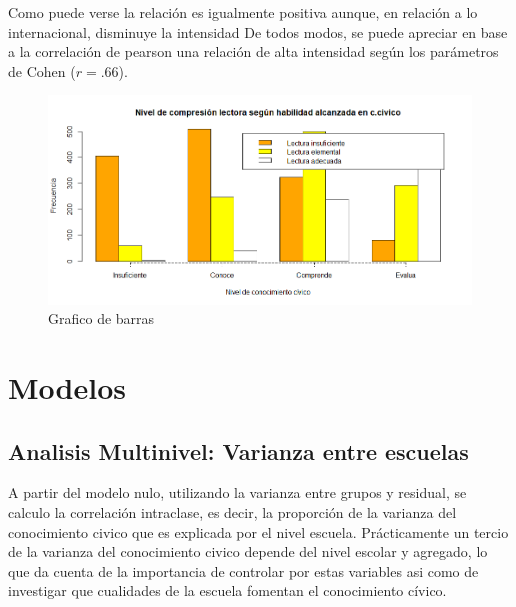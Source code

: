 \documentclass[12pt,twoside]{templates/facsothesis}
\begin{document}
Como puede verse la relación es igualmente positiva aunque, en relación a lo internacional, disminuye la intensidad De todos modos, se puede apreciar en base a la correlación de pearson una relación de alta intensidad según los parámetros de Cohen (\(r= .66\)).

\begin{figure}

{\centering \includegraphics[width=0.8\linewidth]{images/barpot} 

}

\caption{Grafico de barras}\label{fig:unnamed-chunk-10}
\end{figure}

\hypertarget{modelos}{%
\section{Modelos}\label{modelos}}

\hypertarget{analisis-multinivel-varianza-entre-escuelas}{%
\subsection{Analisis Multinivel: Varianza entre escuelas}\label{analisis-multinivel-varianza-entre-escuelas}}

A partir del modelo nulo, utilizando la varianza entre grupos y residual, se calculo la correlación intraclase, es decir, la proporción de la varianza del conocimiento civico que es explicada por el nivel escuela. Prácticamente un tercio de la varianza del conocimiento civico depende del nivel escolar y agregado, lo que da cuenta de la importancia de controlar por estas variables asi como de investigar que cualidades de la escuela fomentan el conocimiento cívico.
\end{document}
